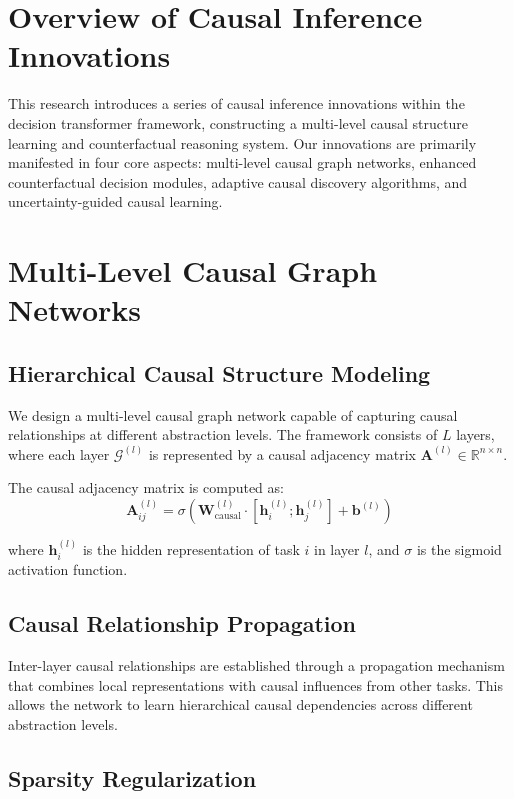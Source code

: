 \documentclass[12pt]{article}
\begin{document}
\section{Overview of Causal Inference Innovations}

This research introduces a series of causal inference innovations within the decision transformer framework, constructing a multi-level causal structure learning and counterfactual reasoning system. Our innovations are primarily manifested in four core aspects: multi-level causal graph networks, enhanced counterfactual decision modules, adaptive causal discovery algorithms, and uncertainty-guided causal learning.

\section{Multi-Level Causal Graph Networks}

\subsection{Hierarchical Causal Structure Modeling}

We design a multi-level causal graph network capable of capturing causal relationships at different abstraction levels. The framework consists of $L$ layers, where each layer $\mathcal{G}^{(l)}$ is represented by a causal adjacency matrix $\mathbf{A}^{(l)} \in \mathbb{R}^{n \times n}$.

The causal adjacency matrix is computed as:
\begin{equation}
\mathbf{A}^{(l)}_{ij} = \sigma\left(\mathbf{W}^{(l)}_{\text{causal}} \cdot [\mathbf{h}_i^{(l)}; \mathbf{h}_j^{(l)}] + \mathbf{b}^{(l)}\right)
\end{equation}

where $\mathbf{h}_i^{(l)}$ is the hidden representation of task $i$ in layer $l$, and $\sigma$ is the sigmoid activation function.

\subsection{Causal Relationship Propagation}

Inter-layer causal relationships are established through a propagation mechanism that combines local representations with causal influences from other tasks. This allows the network to learn hierarchical causal dependencies across different abstraction levels.

\subsection{Sparsity Regularization}
\end{document}
